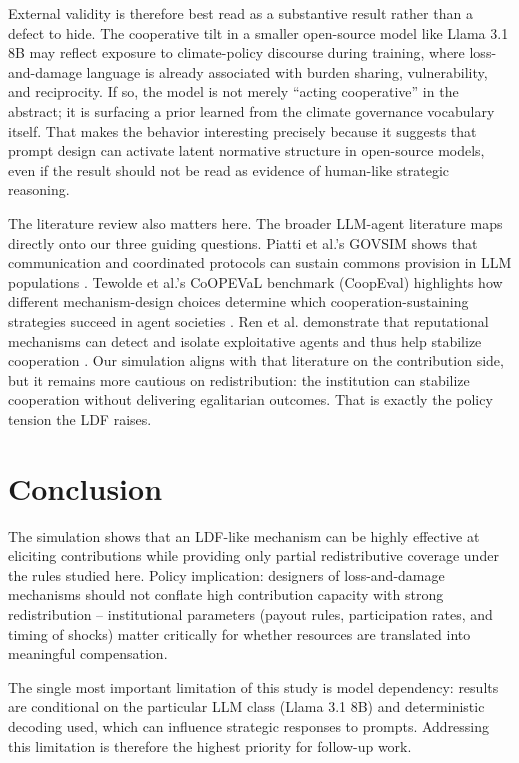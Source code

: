 \documentclass[12pt,letterpaper]{report}
\begin{document}
External validity is therefore best read as a substantive result rather than a defect to hide. The cooperative tilt in a smaller open-source model like Llama 3.1 8B may reflect exposure to climate-policy discourse during training, where loss-and-damage language is already associated with burden sharing, vulnerability, and reciprocity. If so, the model is not merely ``acting cooperative'' in the abstract; it is surfacing a prior learned from the climate governance vocabulary itself. That makes the behavior interesting precisely because it suggests that prompt design can activate latent normative structure in open-source models, even if the result should not be read as evidence of human-like strategic reasoning.

The literature review also matters here. The broader LLM-agent literature maps directly onto our three guiding questions. Piatti et al.'s GOVSIM shows that communication and coordinated protocols can sustain commons provision in LLM populations \citep{piatti2024}. Tewolde et al.'s CoOPEVaL benchmark (CoopEval) highlights how different mechanism-design choices determine which cooperation-sustaining strategies succeed in agent societies \citep{tewolde2026}. Ren et al. demonstrate that reputational mechanisms can detect and isolate exploitative agents and thus help stabilize cooperation \citep{ren2025}. Our simulation aligns with that literature on the contribution side, but it remains more cautious on redistribution: the institution can stabilize cooperation without delivering egalitarian outcomes. That is exactly the policy tension the LDF raises.

\chapter{Conclusion}

The simulation shows that an LDF-like mechanism can be highly effective at eliciting contributions while providing only partial redistributive coverage under the rules studied here. Policy implication: designers of loss-and-damage mechanisms should not conflate high contribution capacity with strong redistribution -- institutional parameters (payout rules, participation rates, and timing of shocks) matter critically for whether resources are translated into meaningful compensation.

The single most important limitation of this study is model dependency: results are conditional on the particular LLM class (Llama 3.1 8B) and deterministic decoding used, which can influence strategic responses to prompts. Addressing this limitation is therefore the highest priority for follow-up work.
\end{document}

